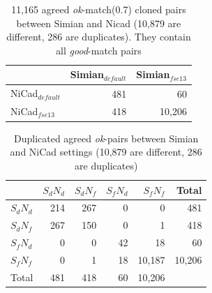\documentclass{IEEEtran}
\begin{document}
\begin{table}[h]
	\centering
	\caption{11,165 agreed \textit{ok}-match(0.7) cloned pairs between Simian and Nicad (10,879 are different, 286 are duplicates). They contain all \textit{good}-match pairs}
	\label{t_agreed_ok_clone_pairs}
	\begin{tabular}{l|r|r}
		\hline
		& Simian$_{\mathrm{\textit{default}}}$ & Simian$_{\mathrm{\textit{fse13}}}$ \\ %
		\hline
		NiCad$_{\mathrm{\textit{default}}}$ & 481 & 60 \\%
		NiCad$_{\mathrm{\textit{fse13}}}$   & 418 & 10,206 \\ %
		\hline
	\end{tabular}
\end{table}

\begin{table}[h]
	\centering
	\caption{Duplicated agreed \textit{ok}-pairs between Simian and NiCad settings (10,879 are different, 286 are duplicates)}
	\label{t_dup_agreed_ok_clone_pairs}
	\begin{tabular}{l|r|r|r|r|r}
		\hline
		& $S_dN_d$ & $S_dN_f$ & $S_fN_d$ & $S_fN_f$ & Total \\ %
		\hline
		$S_dN_d$ & 214 	& 267 	& 0		& 0 		& 481 \\
		$S_dN_f$ & 267 	& 150 	& 0 	& 1 		& 418 \\ 
		$S_fN_d$ & 0 	& 0 	& 42 	& 18  		& 60 \\
		$S_fN_f$ & 0 	& 1 	& 18 	& 10,187 	& 10,206 \\	
		\hline
		Total 	 & 481  & 418	& 60	& 10,206	& \\
		\hline
	\end{tabular}
\end{table}
\end{document}
